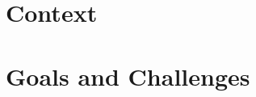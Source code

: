 \documentclass{article}
\begin{document}




\section{Context}





\section{Goals and Challenges}



\end{document}
